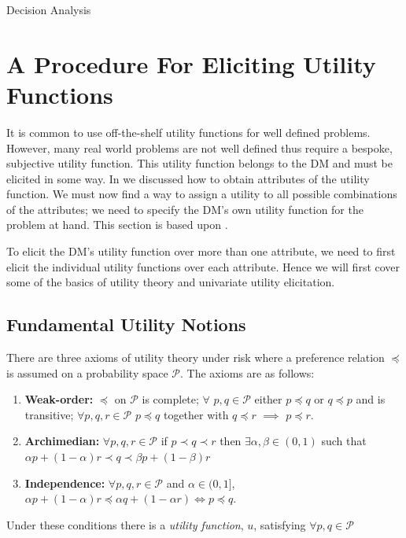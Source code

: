 \begin{chapter}{Decision Analysis \label{Ch:decision}}
\section{A Procedure For Eliciting Utility Functions}

It is common to use off-the-shelf utility functions for well defined problems. However, many real world problems are not well defined thus require a bespoke, subjective utility function. This utility function belongs to the DM and must be elicited in some way. In  we discussed how to obtain attributes of the utility function. We must now find a way to assign a utility to all possible combinations of the attributes; we need to specify the DM's own utility function for the problem at hand. This section is based upon \citet{Gonzalez2018}.

To elicit the DM's utility function over more than one attribute, we need to first elicit the individual utility functions over each attribute. Hence we will first cover some of the basics of utility theory and univariate utility elicitation.

\subsection{Fundamental Utility Notions}

There are three axioms of utility theory under risk where a preference relation $\preceq$ is assumed on a probability space $\mathcal{P}$. The axioms are as follows:

\begin{enumerate}
	\item \textbf{Weak-order:} $\preceq$ on $\mathcal{P}$ is complete; $\forall$ $p, q \in \mathcal{P}$ either $p \preceq q$ or $q \preceq p$ and is transitive; $\forall p, q, r \in \mathcal{P}$  $p \preceq q$ together with $q \preceq r$ $\implies$ $p \preceq r$.

\item \textbf{Archimedian:} $\forall p, q, r \in \mathcal{P}$ if $p \prec q \prec r$ then $\exists \alpha, \beta \in (0, 1) $ such that $\alpha p + (1-\alpha)r \prec q \prec \beta p + (1-\beta) r$
\item \textbf{Independence:} $\forall p, q, r \in \mathcal{P}$ and $\alpha \in (0, 1]$, $\alpha p + (1-\alpha)r \preceq \alpha q + (1-\alpha r) \iff p \preceq q$.
\end{enumerate}

Under these conditions there is a \textit{utility function}, $u$, satisfying $\forall p, q \in \mathcal{P}$


\end{chapter}
